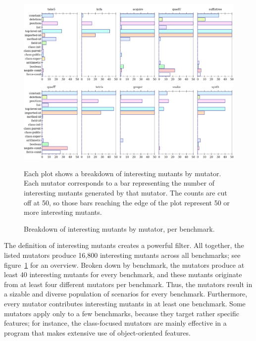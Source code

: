 \begin{figure}
 \centering
 \includegraphics[scale=0.33]{./plots/mutant-breakdown}

 \vspace{1em}

 \begin{minipage}{\textwidth}
 Each plot shows a breakdown of interesting mutants by mutator.
 Each mutator corresponds to a bar representing the number of interesting mutants generated by that mutator.
 The counts are cut off at 50, so those bars reaching the edge of the plot represent 50 or more interesting mutants.
 \end{minipage}

\caption{Breakdown of interesting mutants by mutator, per benchmark.}
 \label{fig:mutant-breakdown}
\end{figure}

The definition of interesting mutants creates a powerful filter. All
together, the listed mutators produce 16,800 interesting mutants across all benchmarks; see
figure~\ref{fig:mutant-breakdown} for an overview. Broken down by benchmark, the
mutators produce at least 40 interesting mutants for every benchmark, and
these mutants originate from at least four different mutators per benchmark.
Thus, the mutators result in a sizable and diverse population of scenarios for
every benchmark.  Furthermore, every mutator contributes interesting mutants in at least
one benchmark.  Some mutators apply only to a few benchmarks, because they
target rather specific features; for instance, the class-focused mutators are
mainly effective in a program that makes extensive use of object-oriented
features.

